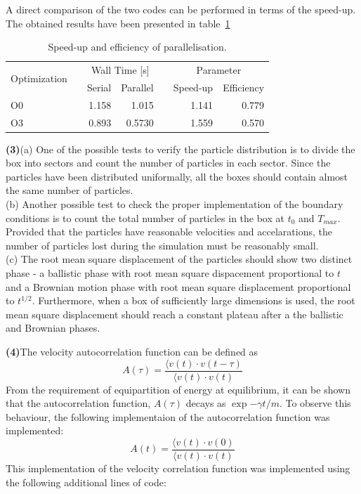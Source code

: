 \documentclass[11pt, oneside]{article}
\begin{document}
A direct comparison of the two codes can be performed in terms of the speed-up. The obtained results have been presented in  table~\ref{tab:su}
\begin{table}[h]
  \caption{Speed-up and efficiency of parallelisation.}
  \label{tab:su}
  \centering
  \begin{tabular}{lcrrcrr}
    \toprule
    \multirow{2}{*}{Optimization} &\phantom{abc} & \multicolumn{2}{c}{Wall Time [s]} &\phantom{abc} & \multicolumn{2}{c}{Parameter} \\
    \cmidrule{3-4} \cmidrule{6-7}
    &\phantom{abc} & {Serial} & {Parallel} & \phantom{abc} & {Speed-up} & {Efficiency}\\
    \midrule
    O0 && 1.158 & 1.015 && 1.141 & 0.779\\
    O3 && 0.893 & 0.5730 && 1.559 & 0.570\\
    \bottomrule
  \end{tabular}
\end{table}

\textbf{(3)}\quad (a) One of the possible tests to verify the particle distribution is to divide the box into sectors and count the number of particles in each sector. Since the particles have been distributed uniformally, all the boxes should contain almost the same number of particles.\\
(b) Another possible test to check the proper implementation of the boundary conditions is to count the total number of particles in the box at \(t_0\) and \(T_{max}\). Provided that the particles have reasonable velocities and accelarations, the number of particles lost during the simulation must be reasonably small.\\ (c) The root mean square displacement of the particles should show two distinct phase - a ballistic phase with root mean square dispacement proportional to \(t\) and a Brownian motion phase with root mean square displacement proportional to \(t^{1/2}\). Furthermore, when a box of sufficiently large dimensions is used, the root mean square displacement should reach a constant plateau after a the ballistic and Brownian phases.     

\textbf{(4)}\quad The velocity autocorrelation function can be defined as \[A(\tau) = \frac{\langle v(t) \cdot v(t-\tau)}{\langle v(t) \cdot v(t)}\] From the requirement of equipartition of energy at equilibrium, it can be shown that the autocorrelation function, \(A(\tau)\) decays as \(\exp{-\gamma t / m}\). To observe this behaviour, the following implementaion of the autocorrelation function was implemented: \[A(t) = \frac{\langle v(t) \cdot v(0)}{\langle v(t) \cdot v(t)}\] This implementation of the velocity correlation function was implemented using the following additional lines of code:
\end{document}
